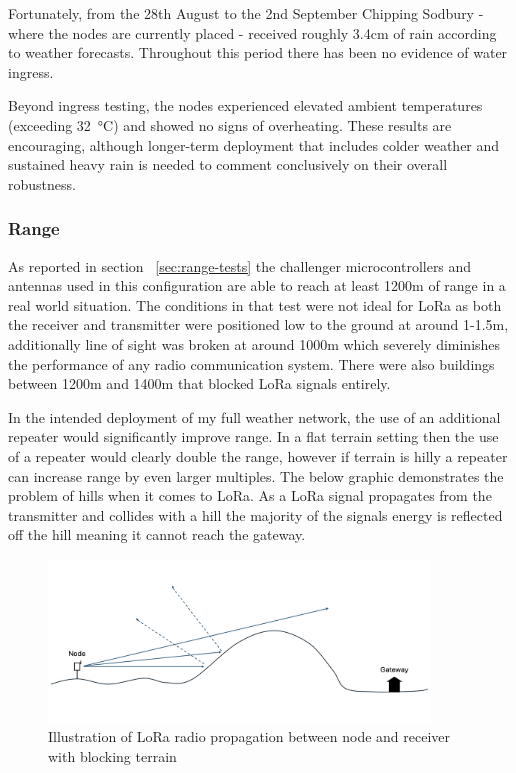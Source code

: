 Fortunately, from the 28th August to the 2nd September Chipping Sodbury - where
the nodes are currently placed - received roughly 3.4cm of rain according to
weather forecasts. Throughout this period there has been no evidence of water
ingress.

Beyond ingress testing, the nodes experienced elevated ambient temperatures
(exceeding \SI{32}{\degreeCelsius}) and showed no signs of overheating. These
results are encouraging, although longer-term deployment that includes colder
weather and sustained heavy rain is needed to comment conclusively on their
overall robustness.

\subsubsection{Range}\label{sec:range-eval}

As reported in section ~\ref{sec:range-tests} the challenger microcontrollers
and antennas used in this configuration are able to reach at least 1200m of
range in a real world situation. The conditions in that test were not ideal for
LoRa as both the receiver and transmitter were positioned low to the ground at
around 1-1.5m, additionally line of sight was broken at around 1000m which
severely diminishes the performance of any radio communication system. There
were also buildings between 1200m and 1400m that blocked LoRa signals entirely.

In the intended deployment of my full weather network, the use of an additional
repeater would significantly improve range. In a flat terrain setting then the
use of a repeater would clearly double the range, however if terrain is hilly a
repeater can increase range by even larger multiples. The below graphic
demonstrates the problem of hills when it comes to LoRa. As a LoRa signal
propagates from the transmitter and collides with a hill the majority of the
signals energy is reflected off the hill meaning it cannot reach the gateway.

\begin{figure}[H]
    \centering
    \includegraphics[width=0.9\textwidth]{contents/part-4/fig4/no-repeater.png}
    \caption{Illustration of LoRa radio propagation between node and receiver with blocking terrain}
    \label{fig:no-repeater}
\end{figure}

